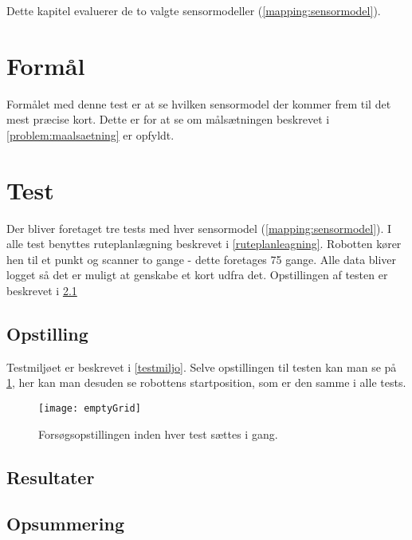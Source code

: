 Dette kapitel evaluerer de to valgte sensormodeller (\cref{mapping:sensormodel}).

\section{Formål}
Formålet med denne test er at se hvilken sensormodel der kommer frem til det mest præcise kort.
Dette er for at se om målsætningen beskrevet i \cref{problem:maalsaetning} er opfyldt.

\section{Test}\label{evaluering:test_beskrivelse}
Der bliver foretaget tre tests med hver sensormodel (\cref{mapping:sensormodel}).
I alle test benyttes ruteplanlægning beskrevet i \cref{ruteplanleagning}.
Robotten kører hen til et punkt og scanner to gange - dette foretages 75 gange.
Alle data bliver logget så det er muligt at genskabe et kort udfra det.
Opstillingen af testen er beskrevet i \cref{evaluering:opstilling}

\subsection{Opstilling}\label{evaluering:opstilling}
Testmiljøet er beskrevet i \cref{testmiljo}.
Selve opstillingen til testen kan man se på \cref{evaluering:emptyGrid}, her kan man desuden se robottens startposition, som er den samme i alle tests.

\begin{figure}[h]
\texttt{[image: emptyGrid]}
\caption{Forsøgsopstillingen inden hver test sættes i gang.}
\label{evaluering:emptyGrid}
\end{figure}
\subsection{Resultater}

\subsection{Opsummering}